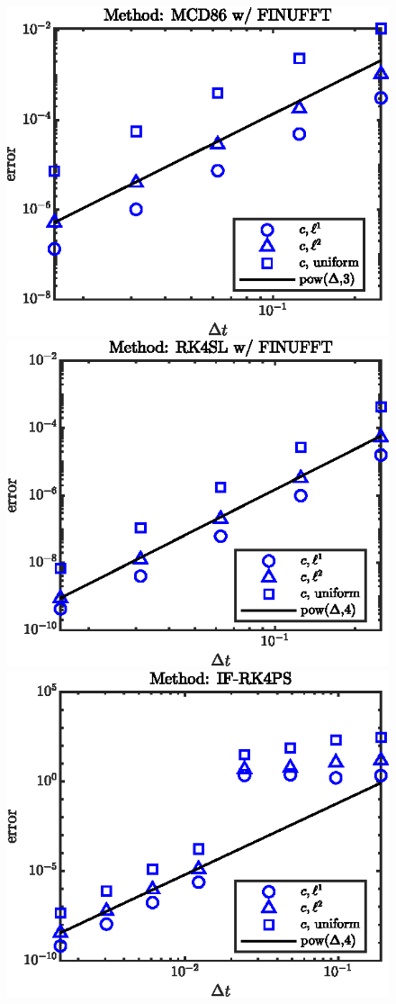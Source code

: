 \documentclass[11pt,letterpaper]{article}
\begin{document}
\begin{figure}[H]
    \includegraphics{figs/conv_order_finu_MCD86}
    \includegraphics{figs/conv_order_finu_RK4SL}
    \includegraphics{figs/conv_order_finu_IFRK4}

\end{figure}
\end{document}
